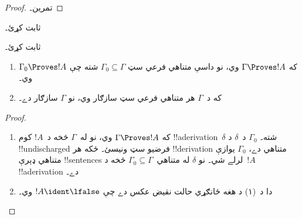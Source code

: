 \documentclass[../../../include/open-logic-section]{subfiles}
\begin{document}
\begin{proof}
تمرين۔
\end{proof}

\begin{prob}
 ثابت کړئ۔
\end{prob}
\tagendprob

\begin{prob}
 ثابت کړئ۔
\end{prob}
\tagendprob

\begin{prop}[تراکم]
  \begin{enumerate}
  \item که $\Gamma \Proves !A$ وي، نو داسې متناهي فرعي سټ
    $\Gamma_0 \subseteq \Gamma$ شته چې $\Gamma_0 \Proves !A$ وي۔
  \item که د~$\Gamma$ هر متناهي فرعي سټ سازګار وي، نو $\Gamma$
    سازګار دے۔
  \end{enumerate}
\end{prop}

\begin{proof}
  \begin{enumerate}
    \item که $\Gamma \Proves !A$ وي، نو له~$\Gamma$ څخه د~$!A$
      کوم !!a{derivation}~$\delta$ شته۔ $\Gamma_0$ د~$\delta$ د
      !!{undischarged} فرضيو سټ ونيسئ۔ ځکه هر !!{derivation} متناهي
      دے، $\Gamma_0$ يوازې متناهي ډېرې !!{sentence}s لرلے شي۔ نو
      $\delta$ له متناهي~$\Gamma_0 \subseteq \Gamma$ څخه د~$!A$
      !!a{derivation} دے۔
    \item دا د~(۱) د هغه ځانګړي حالت نقيض عکس دے چې
      $!A \ident \lfalse$ وي۔
  \end{enumerate}
\end{proof}
\end{document}
